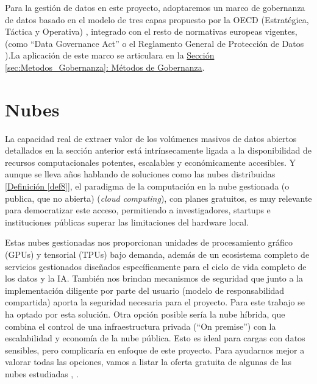 	Para la gestión de datos en este proyecto, adoptaremos un marco de gobernanza de datos basado en el modelo de tres capas propuesto por la OECD (Estratégica, Táctica y Operativa) \citep{OECD2019}, integrado con el resto de normativas europeas vigentes, (como ``Data Governance Act'' \citep{EU_DGA_2022} o el Reglamento General de Protección de Datos \citep{webRGPD2016Europa}).La aplicación de este marco se articulara en la \hyperref[sec:Metodos_Gobernanza]{Sección \ref*{sec:Metodos_Gobernanza}: Métodos de Gobernanza}. \newpage
	
	
\section{Nubes}
\label{sec:EstudiosNubes}

La capacidad real de extraer valor de los volúmenes masivos de datos abiertos detallados en la sección anterior está intrínsecamente ligada a la disponibilidad de recursos computacionales potentes, escalables y económicamente accesibles. Y aunque se lleva años hablando de soluciones como las nubes distribuidas \hyperref[def8]{[Definición \ref*{def8}]}, el paradigma de la computación en la nube gestionada (o publica, que no abierta) (\textit{cloud computing}), con planes gratuitos, es muy relevante para democratizar este acceso, permitiendo a investigadores, startups e instituciones públicas superar las limitaciones del hardware local.

Estas nubes gestionadas nos proporcionan unidades de procesamiento gráfico (GPUs) y tensorial (TPUs) bajo demanda, además de un ecosistema completo de servicios gestionados diseñados específicamente para el ciclo de vida completo de los datos y la IA. También nos brindan mecanismos de seguridad que junto a la implementación diligente por parte del usuario (modelo de responsabilidad compartida) aporta la seguridad necesaria para el proyecto. Para este trabajo se ha optado por esta solución.
Otra opción posible sería la nube híbrida, que combina el control de una infraestructura privada (``On premise'') con la escalabilidad y economía de la nube pública. Esto es ideal para cargas con datos sensibles, pero complicaría en enfoque de este proyecto. 
Para ayudarnos mejor a valorar todas las opciones, vamos a listar la oferta gratuita de algunas de las nubes estudiadas \citep{MicrosoftCloudTerminology}, \citep{lisdorf2021cloud}.

